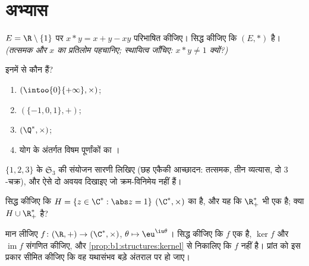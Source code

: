 \section{अभ्यास}

\begin{exercise}[$\star$]\label{exo:b1:structures:1}
$E = \R \setminus \{1\}$ पर $x * y = x + y - xy$ परिभाषित कीजिए। सिद्ध कीजिए
कि $(E, *)$  है। \emph{(तत्समक और $x$ का प्रतिलोम पहचानिए;
स्थायित्व जाँचिए: $x * y \neq 1$ क्यों?)}
\end{exercise}

\begin{exercise}[$\star$]\label{exo:b1:structures:2}
इनमें से कौन  हैं?
\begin{enumerate}
  \item $(\intoo{0}{+\infty}, \times)$;
  \item $(\{-1, 0, 1\}, +)$;
  \item $(\Q^*, \times)$;
  \item योग के अंतर्गत विषम पूर्णांकों का ।
\end{enumerate}
\end{exercise}

\begin{exercise}[$\star$]\label{exo:b1:structures:3}
$\{1,2,3\}$ के  $\mathfrak{S}_3$ की संयोजन सारणी लिखिए (छह एकैकी
आच्छादन: तत्समक, तीन व्यत्यास, दो $3$-चक्र), और ऐसे दो अवयव दिखाइए जो
क्रम-विनिमेय नहीं हैं।
\end{exercise}

\begin{exercise}[$\star$]\label{exo:b1:structures:4}
सिद्ध कीजिए कि $H = \{z \in \C^* : \abs z = 1\}$ $(\C^*, \times)$ का 
है, और यह कि $\R_+^*$ भी एक  है; क्या $H \cup \R_+^*$  है?
\end{exercise}

\begin{exercise}[$\star\star$]\label{exo:b1:structures:5}
मान लीजिए $f \colon (\R, +) \to (\C^*, \times)$, $\theta \mapsto
\eu^{\iu\theta}$। सिद्ध कीजिए कि $f$ एक  है, $\ker f$ और
$\operatorname{im} f$ संगणित कीजिए, और \cref{prop:b1:structures:kernel} से
निकालिए कि $f$  नहीं है। प्रांत को इस प्रकार सीमित कीजिए कि वह यथासंभव
बड़े अंतराल पर  हो जाए।
\end{exercise}


